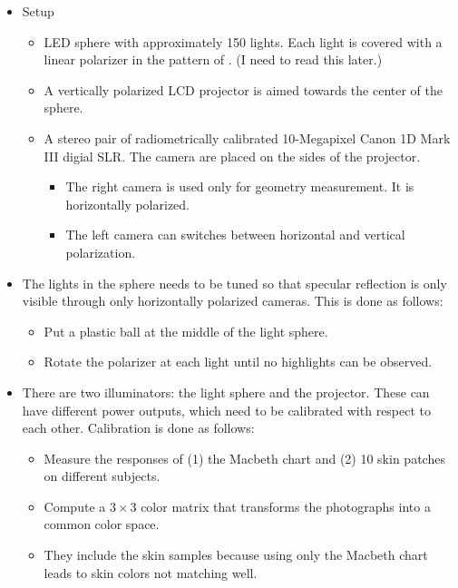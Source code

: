 \documentclass[10pt]{article}
\begin{document}
	\begin{itemize}
		\item Setup
		\begin{itemize}
			\item LED sphere with approximately 150 lights.  Each light is covered with a linear polarizer in the pattern of \cite{Ma:2007}.  (I need to read this later.)

			\item A vertically polarized LCD projector is aimed towards the center of the sphere.

			\item A stereo pair of radiometrically calibrated 10-Megapixel Canon 1D Mark III digial SLR.  The camera are placed on the sides of the projector.
			\begin{itemize}
				\item The right camera is used only for geometry measurement.  It is horizontally polarized.
				\item The left camera can switches between horizontal and vertical polarization. 
			\end{itemize}
		\end{itemize}

		\item The lights in the sphere needs to be tuned so that specular reflection is only visible through only horizontally polarized cameras.  This is done as follows:
		\begin{itemize}
			\item Put a plastic ball at the middle of the light sphere.
			\item Rotate the polarizer at each light until no highlights can be observed. 
		\end{itemize}

		\item There are two illuminators: the light sphere and the projector.  These can have different power outputs, which need to be calibrated with respect to each other.  Calibration is done as follows:
		\begin{itemize}
			\item Measure the responses of (1) the Macbeth chart and (2) 10 skin patches on different subjects.
			\item Compute a $3 \times 3$ color matrix that transforms the photographs into a common color space.
			\item They include the skin samples because using only the Macbeth chart leads to skin colors not matching well. 
		\end{itemize}


\end{itemize}
\end{document}
